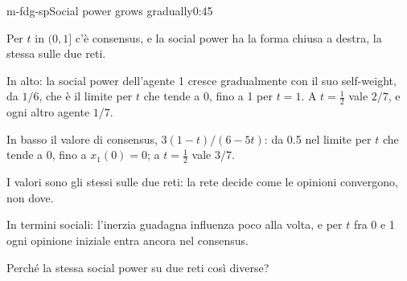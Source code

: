 \begin{slide}{m-fdg-sp}{Social power grows gradually}{0:45}
  \begin{discorso}
    \item Per $t$ in $(0,1]$ c'è {\color{red} } {\color{blue}consensus,} e la social power ha la forma chiusa a destra, la stessa sulle due reti.
    \item In alto: la social power dell'agente 1 cresce gradualmente con il suo self-weight, da $1/6$, che è il limite per $t$ che tende a 0, fino a 1 per $t=1$. A $t=\tfrac12$ vale $2/7$, e ogni altro agente $1/7$.
    \item In basso il valore di {\color{red}} {\color{blue}consensus,} $3(1-t)/(6-5t)$: da 0.5 nel limite per $t$ che tende a 0, fino a $x_1(0)=0$; a $t=\tfrac12$ vale $3/7$.
    \item I valori sono gli stessi sulle due reti: la rete decide come le opinioni convergono, non dove.
    \item In termini sociali: l'inerzia guadagna influenza poco alla volta, e per $t$ fra 0 e 1 ogni opinione iniziale entra ancora nel {\color{red}} {\color{blue}consensus.}
    \item Perché la stessa social power su due reti così diverse?
  \end{discorso}
\end{slide}

